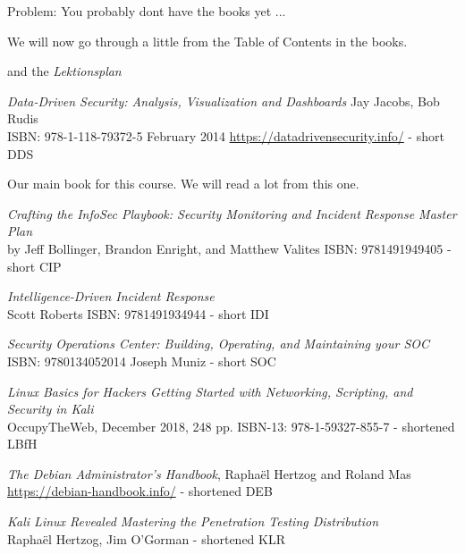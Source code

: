 \documentclass[Screen16to9,17pt]{foils}
\begin{document}
\centerline{Problem: You probably dont have the books yet ...}


We will now go through a little from the Table of Contents in the books.

and the \emph{Lektionsplan}\\



\emph{Data-Driven Security: Analysis, Visualization and Dashboards} Jay Jacobs, Bob Rudis\\
ISBN: 978-1-118-79372-5 February 2014 \url{https://datadrivensecurity.info/} - short DDS

Our main book for this course. We will read a lot from this one.



\emph{Crafting the InfoSec Playbook: Security Monitoring and Incident Response Master Plan}\\
 by Jeff Bollinger, Brandon Enright, and Matthew Valites ISBN: 9781491949405 - short CIP




\emph{Intelligence-Driven Incident Response} \\
 Scott Roberts ISBN: 9781491934944 - short IDI





\emph{Security Operations Center: Building, Operating, and Maintaining your SOC}\\
ISBN: 9780134052014 Joseph Muniz - short SOC


\begin{list2}
\item \emph{Linux Basics for Hackers Getting Started with Networking, Scripting, and Security in Kali}\\
OccupyTheWeb, December 2018, 248 pp. ISBN-13: 978-1-59327-855-7 - shortened LBfH
\item \emph{The Debian Administrator’s Handbook}, Raphaël Hertzog and Roland Mas\\
\url{https://debian-handbook.info/} - shortened DEB
\item \emph{Kali Linux Revealed  Mastering the Penetration Testing Distribution}\\
Raphaël Hertzog, Jim O'Gorman - shortened KLR
\end{list2}
\end{document}
